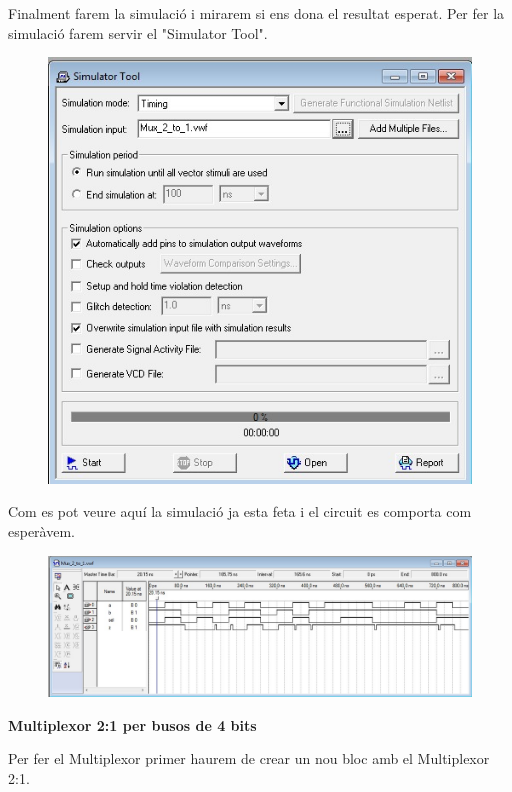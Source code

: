\documentclass[12pt, a4papre]{article}
\begin{document}
	Finalment farem la simulació i mirarem si ens dona el resultat esperat. Per fer la simulació farem servir el "Simulator Tool".
	\begin{figure}[H]
		\begin{center}
		\includegraphics[width=120mm]{finestrasimulacio.jpeg}
		\end{center}
	\end{figure}
	
	Com es pot veure aquí la simulació ja esta feta i el circuit es comporta com esperàvem.
	\begin{figure}[H]
		\begin{center}
		\includegraphics[width=150mm]{simulaciofeta.jpeg}
		\end{center}
	\end{figure}
	
	\textbf{\large{Multiplexor 2:1 per busos de 4 bits}}
	
	Per fer el Multiplexor primer haurem de crear un nou bloc amb el Multiplexor 2:1.
	
\end{document}

